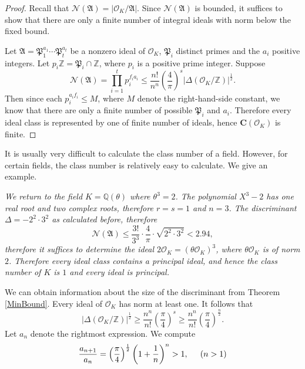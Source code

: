 \begin{proof}
Recall that $\mathcal{N}(\mathfrak{A})=|\mathcal{O}_K/\mathfrak{A}|$. Since $\mathcal{N}(\mathfrak{A})$ is bounded, it suffices to show that there are only a finite number of integral ideals with norm below the fixed bound.\par
Let $\mathfrak{A}=\mathfrak{P}_1^{a_1}\cdots\mathfrak{P}_t^{a_t}$ be a nonzero ideal of $\mathcal{O}_K$, $\mathfrak{P}_i$ distinct primes and the $a_i$ positive integers. Let $p_i\mathbb{Z}=\mathfrak{P}_i\cap\mathbb{Z}$, where $p_i$ is a positive prime integer. Suppose 
$$
\mathcal{N} \left( \mathfrak{A} \right) =\prod_{i=1}^t{p_{i}^{f_ia_i}}\le \frac{n!}{n^n}\left( \frac{4}{\pi} \right) ^s\left| \Delta \left( \mathcal{O} _K/\mathbb{Z} \right) \right|^{\frac{1}{2}}.
$$
Then since each $p_i^{a_if_i}\le M$, where $M$ denote the right-hand-side constant, we know that there are only a finite number of possible $\mathfrak{P}_i$ and $a_i$. Therefore every ideal class is represented by one of finite number of ideals, hence $\mathbf{C}(\mathcal{O}_K)$ is finite.
\end{proof}
It is usually very difficult to calculate the class number of a field. However, for certain fields, the class number is relatively easy to calculate. We give an example.
\begin{example}\em
We return to the field $K=\mathbb{Q}(\theta)$ where $\theta^3=2$. The polynomial $X^3-2$ has one real root and two complex roots, therefore $r=s=1$ and $n=3$. The discriminant $\Delta=-2^2\cdot 3^2$ as calculated before, therefore 
$$
\mathcal{N} \left( \mathfrak{A} \right) \le \frac{3!}{3^3}\cdot \frac{4}{\pi}\cdot \sqrt{2^2\cdot 3^2}<2.94,
$$
therefore it suffices to determine the ideal $2\mathcal{O}_K=(\theta\mathcal{O}_K)^3$, where $\theta\mathcal{O}_K$ is of norm $2$. Therefore every ideal class contains a principal ideal, and hence the class number of $K$ is $1$ and every ideal is principal.
\end{example}
We can obtain information about the size of the discriminant from Theorem \ref{MinBound}. Every ideal of $\mathcal{O}_K$ has norm at least one. It follows that 
$$
\left| \Delta \left( \mathcal{O} _K/\mathbb{Z} \right) \right|^{\frac{1}{2}}\ge \frac{n^n}{n!}\left( \frac{\pi}{4} \right) ^s\ge \frac{n^n}{n!}\left( \frac{\pi}{4} \right) ^{\frac{n}{2}}.
$$
Let $a_n$ denote the rightmost expression. We compute 
$$
\frac{a_{n+1}}{a_n}=\left( \frac{\pi}{4} \right) ^{\frac{1}{2}}\left( 1+\frac{1}{n} \right) ^n>1,\hspace{0.5cm}\left( n>1 \right) 
$$
